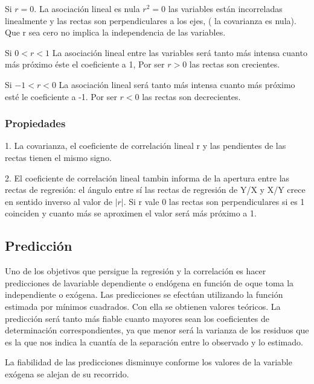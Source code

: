 \documentclass{article}
\begin{document}
Si $r = 0$. La asociación lineal es nula $r^2 = 0$ las variables están incorreladas linealmente y las rectas son perpendiculares a los ejes, ( la covarianza es nula).  Que r sea cero no implica la independencia de las variables.

Si $ 0 < r < 1 $ La asociación lineal entre las variables será tanto más intensa cuanto más próximo éste el coeficiente a 1, Por ser $ r > 0 $ las rectas son crecientes.

Si $ -1 < r < 0 $ La asociación lineal será tanto más intensa cuanto más próximo esté le coeficiente a -1. Por ser $ r < 0$ las rectas son decrecientes.

\subsubsection{Propiedades}

1. La covarianza, el coeficiente de correlación lineal r y las pendientes de las rectas tienen el mismo signo.


2. El coeficiente de correlación lineal tambin informa de la apertura entre las rectas de regresión: el ángulo entre sí las rectas de regresión de Y/X y X/Y crece en sentido inverso al valor de $ |r| $. Si r vale 0 las rectas son perpendiculares si es 1 coinciden y cuanto más se aproximen el valor será más próximo a 1.

\subsection{Predicción}

Uno de los objetivos que persigue la regresión y la correlación es hacer predicciones de lavariable dependiente o endógena en función de oque toma la independiente o exógena. Las predicciones se efectúan utilizando la función estimada por mínimos cuadrados. Con ella se obtienen valores teóricos. La predicción será tanto más fiable cuanto mayores sean los coeficientes de determinación correspondientes, ya que menor será la varianza de los residuos que es la que nos indica la cuantía de la separación entre lo observado y lo estimado.

La fiabilidad de las predicciones disminuye conforme los valores de la variable exógena se alejan de su recorrido.

 
\end{document}
